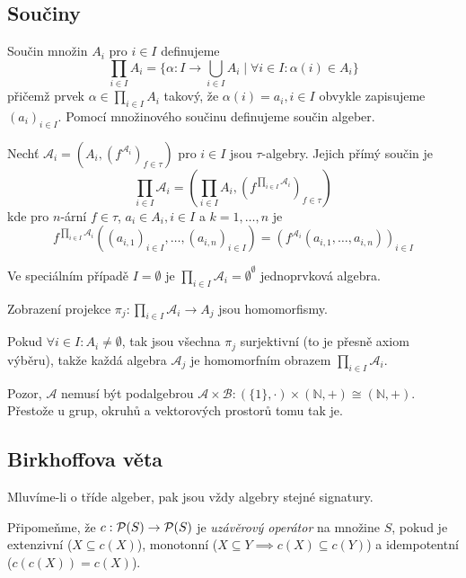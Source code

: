 \subsection{Součiny}

Součin množin $A_i$ pro $i \in I$ definujeme
\[
    \prod_{i \in I} A_i = \{ \alpha : I \to \bigcup_{i \in I} A_i
    \mid \forall i \in I : \alpha(i) \in A_i \}
\]
přičemž prvek $\alpha \in \prod_{i \in I} A_i$ takový, že $\alpha(i) =
a_i, i \in I$ obvykle zapisujeme $(a_i)_{i \in I}$.
Pomocí množinového součinu definujeme součin algeber.

\begin{definition}
    Nechť $\mathcal{A}_i = (A_i, (f^{\mathcal{A}_i})_{f \in \tau})$ pro
    $i \in I$ jsou $\tau$-algebry. Jejich přímý součin je
    \[
        \prod_{i \in I} \mathcal{A}_i = (\prod_{i \in I} A_i,
        (f^{\prod_{i \in I} \mathcal{A}_i})_{f \in \tau})
    \]
    kde pro $n$-ární $f \in \tau$, $a_i \in A_i, i \in I$
    a $k = 1,\ldots,n$ je
    \[
    f^{\prod_{i \in I} \mathcal{A}_i}
    ((a_{i,1})_{i \in I}, \ldots, (a_{i,n})_{i \in I})
    = (f^{\mathcal{A}_i}(a_{i,1}, \ldots, a_{i,n}))_{i \in I}
    \]
\end{definition}

Ve speciálním případě $I = \emptyset$ je
$\prod_{i \in I} \mathcal{A}_i = \emptyset^\emptyset$ jednoprvková
algebra.

Zobrazení projekce
$\pi_j : \prod_{i \in I} \mathcal{A}_i \to A_j$ jsou homomorfismy.

Pokud $\forall i \in I : A_i \neq \emptyset$, tak jsou všechna $\pi_j$
surjektivní (to je přesně axiom výběru), takže každá algebra
$\mathcal{A}_j$ je homomorfním obrazem
$\prod_{i \in I} \mathcal{A}_i$.

Pozor, $\mathcal{A}$ nemusí být podalgebrou
$\mathcal{A} \times \mathcal{B} :
(\{1\}, \cdot) \times (\mathbb{N}, {+}) \cong (\mathbb{N}, {+})$.
Přestože u grup, okruhů a vektorových prostorů tomu tak je.

\subsection{Birkhoffova věta}

Mluvíme-li o tříde algeber, pak jsou vždy algebry stejné signatury.

Připomeňme, že $c : \mathcal{P}(S) \to \mathcal{P}(S)$
je {\em uzávěrový operátor} na množine $S$,
pokud je extenzivní ($X \subseteq c(X)$), monotonní
($X \subseteq Y \implies c(X) \subseteq c(Y)$)
a idempotentní ($c(c(X)) = c(X)$).


